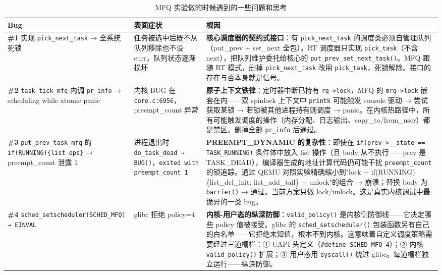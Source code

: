 \documentclass[a4paper]{article}
\begin{document}
\begin{table}[htbp]
\centering
\footnotesize
\caption{MFQ 实验做的时候遇到的一些问题和思考}
\label{tab:mfq_bugs}
\begin{tabular}{p{2.5cm}p{3cm}p{8cm}}
\toprule
\textbf{Bug} & \textbf{表面症状} & \textbf{根因} \\
\midrule
\textbf{\#1} 实现 \texttt{pick\_next\_task} → 全系统死锁 & 任务被选中后既不从队列移除也不设 curr，队列状态逐渐损坏 & \textbf{核心调度器的契约式接口}：有 \texttt{pick\_next\_task} 的调度类必须自管理队列（put\_prev + set\_next 全包）。RT 调度器只实现 \texttt{pick\_task}（不含 next），把队列维护委托给核心的 \texttt{put\_prev\_set\_next\_task()}。MFQ 跟随 RT 模式，删掉 \texttt{pick\_next\_task} 改用 \texttt{pick\_task}，死锁解除。接口的存在与否本身就是信号。 \\
\midrule
\textbf{\#2} \texttt{task\_tick\_mfq} 内调 \texttt{pr\_info} → scheduling while atomic panic & 内核 BUG 在 \texttt{core.c:6956}，preempt\_count 异常 & \textbf{原子上下文铁律}：定时器中断已持有 \texttt{rq->lock}，MFQ 的 \texttt{mrq->lock} 嵌套在内——双 spinlock 上下文中 \texttt{printk} 可能触发 console 驱动 → 尝试获取某锁 → 若锁被其他进程持有则调度 → panic。在内核热路径中，所有可能触发调度的操作（内存分配、日志输出、copy\_to/from\_user）都是禁区。删掉全部 \texttt{pr\_info} 后通过。 \\
\midrule
\textbf{\#3} \texttt{put\_prev\_task\_mfq} 的 \texttt{if(RUNNING)\{list ops\}} → preempt\_count 泄露 1 & 进程退出时 \texttt{do\_task\_dead → BUG()}，\texttt{exited with preempt\_count 1} & \textbf{PREEMPT\_DYNAMIC 的复杂性}：即使在 \texttt{if(prev->\_\_state == TASK\_RUNNING)} 条件体中放入 list 操作（且 body 从不执行——prev 是 TASK\_DEAD），编译器生成的地址计算代码仍可能干扰 \texttt{preempt\_count} 的锁追踪。通过 QEMU 对照实验精确缩小到"lock + if(RUNNING)\{list\_del\_init; list\_add\_tail\} + unlock"的组合 → 崩溃；替换 body 为 \texttt{barrier()} → 通过。当前方案只做 lock/unlock。这是真实内核调试中最诡异的一类 bug。 \\
\midrule
\textbf{\#4} \texttt{sched\_setscheduler(SCHED\_MFQ) → EINVAL} & glibc 拒绝 policy=4 & \textbf{内核-用户态的纵深防御}：\texttt{valid\_policy()} 是内核侧防御线——它决定哪些 policy 值被接受。glibc 的 \texttt{sched\_setscheduler()} 包装函数另有自己的白名单——它拒绝未知值，根本不到内核。这意味着自定义调度策略需要经过三道栅栏：① UAPI 头定义（\texttt{\#define SCHED\_MFQ 4}）；② 内核 \texttt{valid\_policy()} 扩展；③ 用户态用 \texttt{syscall()} 绕过 glibc。每道栅栏独立运行——纵深防御。 \\
\bottomrule
\end{tabular}
\end{table}
\end{document}
